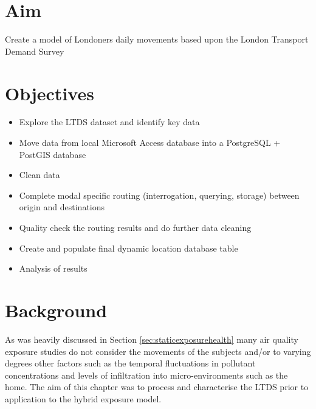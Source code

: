 \section{Aim}
\label{sec:1aim}

Create a model of Londoners daily movements based upon the London Transport Demand Survey

\section{Objectives}
\label{sec:1objectives}

\begin{itemize}
\item Explore the LTDS dataset and identify key data
\item Move data from local Microsoft Access database into a PostgreSQL + PostGIS database
\item Clean data
\item Complete modal specific routing (interrogation, querying, storage) between origin and destinations
\item Quality check the routing results and do further data cleaning
\item Create and populate final dynamic location database table
\item Analysis of results
\end{itemize}

\section{Background}
\label{sec:1_background}

As was heavily discussed in Section \ref{sec:staticexposurehealth} many air quality exposure studies do not consider the movements of the subjects and/or to varying degrees other factors such as the temporal fluctuations in pollutant concentrations and levels of infiltration into micro-environments such as the home. The aim of this chapter was to process and characterise the LTDS prior to application to the hybrid exposure model. 

